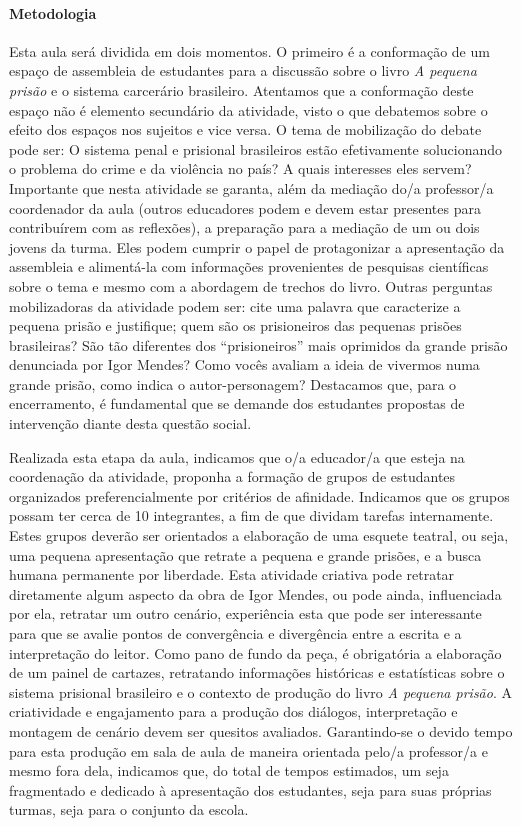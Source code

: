 \documentclass[11pt]{extarticle}
\begin{document}
\paragraph{Metodologia} Esta aula será dividida em dois momentos. O
primeiro é a conformação de um espaço de assembleia de estudantes para a
discussão sobre o livro \emph{A pequena prisão} e o sistema carcerário
brasileiro. Atentamos que a conformação deste espaço não é elemento
secundário da atividade, visto o que debatemos sobre o efeito dos
espaços nos sujeitos e vice versa. O tema de mobilização do debate pode
ser: O sistema penal e prisional brasileiros estão efetivamente
solucionando o problema do crime e da violência no país? A quais
interesses eles servem? Importante que nesta atividade se garanta, além
da mediação do/a professor/a coordenador da aula (outros educadores
podem e devem estar presentes para contribuírem com as reflexões), a
preparação para a mediação de um ou dois jovens da turma. Eles podem
cumprir o papel de protagonizar a apresentação da assembleia e
alimentá-la com informações provenientes de pesquisas científicas sobre
o tema e mesmo com a abordagem de trechos do livro. Outras perguntas
mobilizadoras da atividade podem ser: cite uma palavra que caracterize a
pequena prisão e justifique; quem são os prisioneiros das pequenas
prisões brasileiras? São tão diferentes dos ``prisioneiros'' mais
oprimidos da grande prisão denunciada por Igor Mendes? Como vocês
avaliam a ideia de vivermos numa grande prisão, como indica o
autor-personagem? Destacamos que, para o encerramento, é fundamental que
se demande dos estudantes propostas de intervenção diante desta questão
social.

Realizada esta etapa da aula, indicamos que o/a educador/a que esteja na
coordenação da atividade, proponha a formação de grupos de estudantes
organizados preferencialmente por critérios de afinidade. Indicamos que
os grupos possam ter cerca de 10 integrantes, a fim de que dividam
tarefas internamente. Estes grupos deverão ser orientados a elaboração
de uma esquete teatral, ou seja, uma pequena apresentação que retrate a
pequena e grande prisões, e a busca humana permanente por liberdade.
Esta atividade criativa pode retratar diretamente algum aspecto da obra
de Igor Mendes, ou pode ainda, influenciada por ela, retratar um outro
cenário, experiência esta que pode ser interessante para que se avalie
pontos de convergência e divergência entre a escrita e a interpretação
do leitor. Como pano de fundo da peça, é obrigatória a elaboração de um
painel de cartazes, retratando informações históricas e estatísticas
sobre o sistema prisional brasileiro e o contexto de produção do livro
\emph{A pequena prisão}. A criatividade e engajamento para a produção
dos diálogos, interpretação e montagem de cenário devem ser quesitos
avaliados. Garantindo-se o devido tempo para esta produção em sala de
aula de maneira orientada pelo/a professor/a e mesmo fora dela,
indicamos que, do total de tempos estimados, um seja fragmentado e
dedicado à apresentação dos estudantes, seja para suas próprias turmas,
seja para o conjunto da escola.
\end{document}
